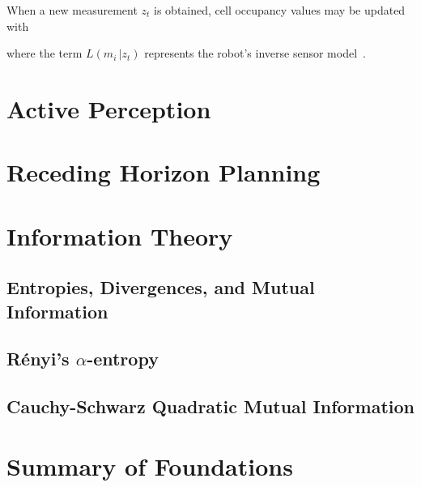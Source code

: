 When a new measurement $z_t$ is obtained, cell occupancy values may be updated with
%

where the term $L\left(m_{i}\,  \vert z_{t}\right)$ represents the robot's inverse sensor model~\cite{thrun2005probabilistic}.



\section{Active Perception}
\label{sec:active_perception}

\section{Receding Horizon Planning}
\label{sec:receding_horizon}

\section{Information Theory}
\label{sec:information_theory}

\subsection{Entropies, Divergences, and Mutual Information}

\subsection{R\'{e}nyi's $\alpha$-entropy}

\subsection{Cauchy-Schwarz Quadratic Mutual Information}

\section{Summary of Foundations}
